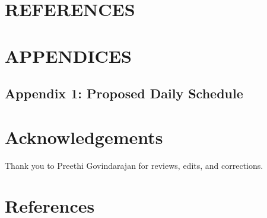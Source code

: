 \documentclass[a4paper, amsfonts, amssymb, amsmath, reprint, showkeys, nofootinbib, twoside]{revtex4-1}
\begin{document}
\section{REFERENCES}
\section{APPENDICES}
\subsection{Appendix 1: Proposed Daily Schedule}

\section*{Acknowledgements}

Thank you to Preethi Govindarajan for reviews, edits, and corrections.


\section*{References}

{}


% 
\end{document}
